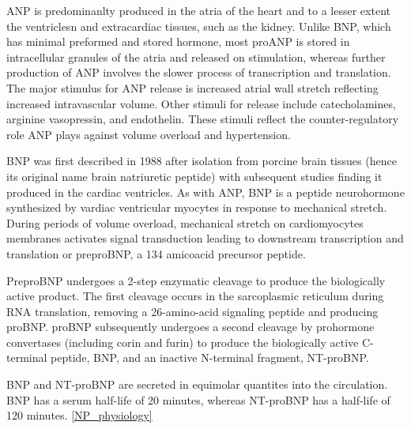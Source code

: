\documentclass[14pt,a4paper,onecolumn]{extarticle}
\begin{document}
ANP is predominanlty produced in the atria of the heart and to a lesser extent the ventriclesn and extracardiac tissues, such as the kidney.  Unlike BNP, which has minimal preformed and  stored hormone, most proANP is stored in intracellular granules of the atria and released on stimulation, whereas further production of ANP involves the slower process of transcription and translation.  The major stimulus for ANP release is increased atrial wall stretch reflecting increased intravascular volume.  Other stimuli for release include catecholamines, arginine vasopressin, and endothelin.  These stimuli reflect the counter-regulatory role ANP plays against volume overload and hypertension.  \citep{Maisel2018} %

BNP was first described in 1988 after isolation from porcine brain tissues (hence its original name brain natriuretic peptide) with subsequent studies finding it produced in the cardiac ventricles.  As with ANP, BNP is a peptide neurohormone synthesized by vardiac ventricular myocytes in response to mechanical stretch.  During periods of volume overload, mechanical stretch on cardiomyocytes membranes activates signal transduction leading to downstream transcription and translation or preproBNP, a 134 amicoacid precursor peptide. \citep{Maisel2018} %

PreproBNP undergoes a 2-step enzymatic cleavage to produce the biologically active product.  The first cleavage occurs in the sarcoplasmic reticulum during RNA translation, removing a 26-amino-acid signaling peptide and producing proBNP.  proBNP subsequently undergoes a second cleavage by prohormone convertases (including corin and furin) to produce the biologically active C-terminal peptide, BNP, and an inactive N-terminal fragment, NT-proBNP.  \citep{Hammerer-Lercher2008} %

BNP and NT-proBNP are secreted in equimolar quantites into the circulation.  BNP has a serum half-life of 20 minutes, whereas NT-proBNP has a half-life of 120 minutes. \ref{NP_physiology} \citep{DanielsandMaisel2007} %
\end{document}
